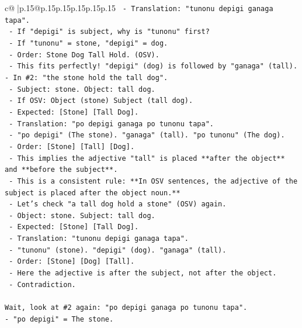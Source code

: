 \documentclass{article}
\begin{document}
{\begin{supertabular}{c@{$\;$}|p{.15\linewidth}@{}p{.15\linewidth}p{.15\linewidth}p{.15\linewidth}p{.15\linewidth}p{.15\linewidth}}
{{{\texttt{  {-} Translation: "tunonu depigi ganaga tapa".} \\
\texttt{  {-} If "depigi" is subject, why is "tunonu" first?} \\
\texttt{  {-} If "tunonu" = stone, "depigi" = dog.} \\
\texttt{  {-} Order: Stone Dog Tall Hold. (OSV).} \\
\texttt{  {-} This fits perfectly! "depigi" (dog) is followed by "ganaga" (tall).} \\
\texttt{{-} In \#2: "the stone hold the tall dog".} \\
\texttt{  {-} Subject: stone. Object: tall dog.} \\
\texttt{  {-} If OSV: Object (stone) Subject (tall dog).} \\
\texttt{  {-} Expected: {[}Stone{]} {[}Tall Dog{]}.} \\
\texttt{  {-} Translation: "po depigi ganaga po tunonu tapa".} \\
\texttt{  {-} "po depigi" (The stone). "ganaga" (tall). "po tunonu" (The dog).} \\
\texttt{  {-} Order: {[}Stone{]} {[}Tall{]} {[}Dog{]}.} \\
\texttt{  {-} This implies the adjective "tall" is placed **after the object** and **before the subject**.} \\
\texttt{  {-} This is a consistent rule: **In OSV sentences, the adjective of the subject is placed after the object noun.**} \\
\texttt{  {-} Let's check "a tall dog hold a stone" (OSV) again.} \\
\texttt{    {-} Object: stone. Subject: tall dog.} \\
\texttt{    {-} Expected: {[}Stone{]} {[}Tall Dog{]}.} \\
\texttt{    {-} Translation: "tunonu depigi ganaga tapa".} \\
\texttt{    {-} "tunonu" (stone). "depigi" (dog). "ganaga" (tall).} \\
\texttt{    {-} Order: {[}Stone{]} {[}Dog{]} {[}Tall{]}.} \\
\texttt{    {-} Here the adjective is after the subject, not after the object.} \\
\texttt{    {-} Contradiction.} \\
\\ 
\texttt{Wait, look at \#2 again: "po depigi ganaga po tunonu tapa".} \\
\texttt{{-} "po depigi" = The stone.} \\
}}}
\end{supertabular}}
\end{document}
